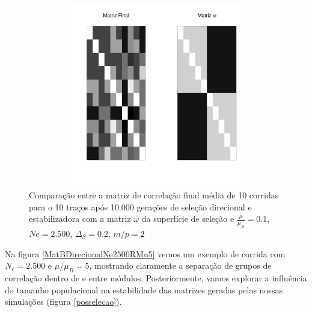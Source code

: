 \begin{figure}[htbp]
   \centering
   \includegraphics[width=150mm, height=80mm]{figuras/RMu01Omega}
   \caption{Comparação entre a matriz de correlação final média de 10
      corridas para o 10 traços após 10.000 gerações de seleção direcional e
      estabilizadora com a matriz $\omega$ da superfície de seleção e
   $\frac{\mu}{\mu_B}=0.1$, $Ne=2.500$, $\Delta_S=0.2$, $m/p=2$}
   \label{RMu01}
\end{figure}


Na figura \ref{MatBDirecionalNe2500RMu5} vemos um exemplo de corrida com
$N_e = 2.500$ e $\mu/\mu_B=5$, mostrando claramente a separação de grupos
de correlação dentro de e entre módulos. 
Posteriormente, vamos explorar a influência do tamanho populacional na
estabilidade das matrizes geradas pelas nossas simulações (figura
\ref{posselecao}). 


